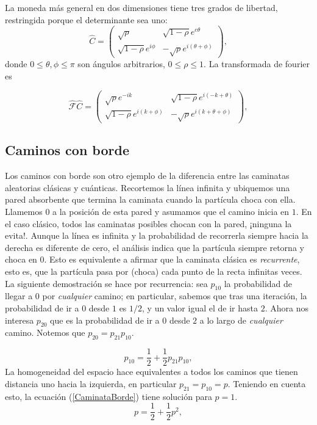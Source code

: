 La moneda más general en dos dimensiones tiene tres grados de libertad, restringida porque el determinante sea uno:
\begin{equation}
    \hat{C}=
    \begin{pmatrix}
    \sqrt{\rho}&\sqrt{1-\rho}e^{e\theta}\\
    \sqrt{1-\rho}e^{i\phi} & -\sqrt{\rho}e^{i(\theta+\phi)}
    \end{pmatrix}{},
    \label{MonedaGeneral}
\end{equation}{}
donde $0\leq\theta,\phi\leq\pi$ son ángulos arbitrarios, $0\leq\rho\leq1$. La transformada de fourier es

\begin{equation}
    \hat{\mathcal{F}} \hat{C}=
    \begin{pmatrix}
    \sqrt{\rho}e^{-ik}&\sqrt{1-\rho}e^{i(-k+\theta)}\\
    \sqrt{1-\rho}e^{i(k+\phi)} & -\sqrt{\rho}e^{i(k+\theta+\phi)}
    \end{pmatrix}{},
    \label{MonedaGeneral}
\end{equation}{}

\subsection{Caminos con borde}
Los caminos con borde son otro ejemplo de la diferencia entre las caminatas aleatorias clásicas y cuánticas. Recortemos la línea infinita y ubiquemos una pared absorbente que termina la caminata cuando la partícula choca con ella. Llamemos $0$ a la posición de esta pared y asumamos que el camino inicia en $1$. En el caso clásico, todos las caminatas posibles chocan con la pared, ¡ninguna la evita!. Aunque la línea es infinita y la probabilidad de recorrerla siempre hacia la derecha es diferente de cero, el análisis indica que la partícula siempre retorna y choca en $0$. Esto es equivalente a afirmar que la caminata clásica es \textit{recurrente}, esto es, que la partícula pasa por (choca) cada punto de la recta infinitas veces. La siguiente demostración se hace por recurrencia: sea $p_{10}$ la probabilidad de llegar a $0$ por \textit{cualquier} camino; en particular, sabemos que tras una iteración, la probabilidad de ir a $0$ desde $1$ es $1/2$, y un valor igual el de ir hasta $2$. Ahora nos interesa $p_{20}$ que es la probabilidad de ir a $0$ desde $2$ a lo largo de \textit{cualquier} camino. Notemos que $p_{20}=p_{21}p_{10}$.

\begin{equation}
p_{10}=\frac{1}{2}+\frac{1}{2}p_{21}p_{10} ,
\label{CaminataBorde}
\end{equation}{}
La homogeneidad del espacio hace equivalentes a todos los caminos que tienen distancia uno hacia la izquierda, en particular $p_{21}=p_{10}=p$. Teniendo en cuenta esto, la ecuación (\ref{CaminataBorde}) tiene solución para $p=1$. 
\begin{equation}
p=\frac{1}{2}+\frac{1}{2}p^2 ,
\end{equation}

